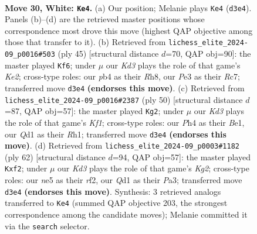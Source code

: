 \documentclass[11pt]{article}
\begin{document}
\clearpage

\begin{figure}[p]\centering
\begin{subfigure}{0.46\textwidth}\centering
\resizebox{\linewidth}{!}{%
\newchessgame
\chessboard[
  setfen={r6r/4k2p/1pp1p1p1/4n3/1p1P3P/P2KPRb1/RP4q1/2BQ4 w - - 2 30},
  showmover=false,
  pgfstyle=straightmove, color=movearrow, markmove={d3-e4}
]}
\caption{}
\end{subfigure}\hfill
\begin{subfigure}{0.46\textwidth}\centering
\resizebox{\linewidth}{!}{%
\newchessgame
\chessboard[
  setfen={Q6r/p1rnkbq1/2p1p3/5N1p/2pP2p1/6P1/PP3PBP/R3R1K1 b - - 0 23},
  showmover=false,
  pgfstyle=straightmove, color=movearrow, markmove={e7-f6}
]}
\caption{}
\end{subfigure}
\\[4pt]
\begin{subfigure}{0.46\textwidth}\centering
\resizebox{\linewidth}{!}{%
\newchessgame
\chessboard[
  setfen={r6r/p4k2/q1pbp1p1/8/3Pp2P/1p2P2Q/P4P2/R3BK1R w - - 0 26},
  showmover=false,
  pgfstyle=straightmove, color=movearrow, markmove={f1-g2}
]}
\caption{}
\end{subfigure}\hfill
\begin{subfigure}{0.46\textwidth}\centering
\resizebox{\linewidth}{!}{%
\newchessgame
\chessboard[
  setfen={2r3k1/5p2/b3p2q/2npP2P/3Q2B1/Pp1PR1P1/1P3rK1/2R5 w - - 0 32},
  showmover=false,
  pgfstyle=straightmove, color=movearrow, markmove={g2-f2}
]}
\caption{}
\end{subfigure}
\caption{\textbf{Move 30, White: \texttt{Ke4}.} (a) Our position; Melanie plays \texttt{Ke4} (\texttt{d3e4}). Panels (b)--(d) are the retrieved master positions whose correspondence most drove this move (highest QAP objective among those that transfer to it). (b) Retrieved from \texttt{lichess\_elite\_2024-09\_p0016\#503} (ply 45) [structural distance $d$=70, QAP obj=90]: the master played \texttt{Kf6}; under $\mu$ our \emph{Kd3} plays the role of that game's \emph{Ke2}; cross-type roles: our \emph{p}b4 as their \emph{R}h8, our \emph{P}e3 as their \emph{R}c7; transferred move \texttt{d3e4} \textbf{(endorses this move)}. (c) Retrieved from \texttt{lichess\_elite\_2024-09\_p0016\#2387} (ply 50) [structural distance $d$=87, QAP obj=57]: the master played \texttt{Kg2}; under $\mu$ our \emph{Kd3} plays the role of that game's \emph{Kf1}; cross-type roles: our \emph{P}h4 as their \emph{B}e1, our \emph{Q}d1 as their \emph{R}h1; transferred move \texttt{d3e4} \textbf{(endorses this move)}. (d) Retrieved from \texttt{lichess\_elite\_2024-09\_p0003\#1182} (ply 62) [structural distance $d$=94, QAP obj=57]: the master played \texttt{Kxf2}; under $\mu$ our \emph{Kd3} plays the role of that game's \emph{Kg2}; cross-type roles: our \emph{n}e5 as their \emph{r}f2, our \emph{Q}d1 as their \emph{P}a3; transferred move \texttt{d3e4} \textbf{(endorses this move)}. Synthesis: 3 retrieved analogs transferred to \texttt{Ke4} (summed QAP objective 203, the strongest correspondence among the candidate moves); Melanie committed it via the \texttt{search} selector.}
\label{fig:thought-m58}
\end{figure}
\end{document}
